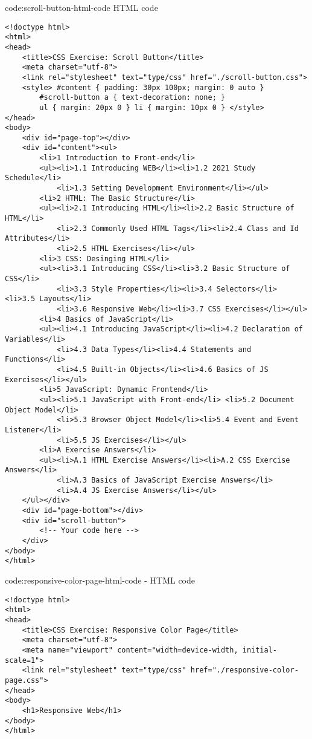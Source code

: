 \begin{code}{code:scroll-button-html-code}{ HTML code}
\begin{verbatim}
<!doctype html>
<html>
<head>
    <title>CSS Exercise: Scroll Button</title>
    <meta charset="utf-8">
    <link rel="stylesheet" text="type/css" href="./scroll-button.css">
    <style> #content { padding: 30px 100px; margin: 0 auto }
        #scroll-button a { text-decoration: none; }
        ul { margin: 20px 0 } li { margin: 10px 0 } </style>
</head>
<body>
    <div id="page-top"></div>
    <div id="content"><ul>
        <li>1 Introduction to Front-end</li>
        <ul><li>1.1 Introducing WEB</li><li>1.2 2021 Study Schedule</li>
            <li>1.3 Setting Development Environment</li></ul>
        <li>2 HTML: The Basic Structure</li>
        <ul><li>2.1 Introducing HTML</li><li>2.2 Basic Structure of HTML</li>
            <li>2.3 Commonly Used HTML Tags</li><li>2.4 Class and Id Attributes</li>
            <li>2.5 HTML Exercises</li></ul>
        <li>3 CSS: Desinging HTML</li>
        <ul><li>3.1 Introducing CSS</li><li>3.2 Basic Structure of CSS</li>
            <li>3.3 Style Properties</li><li>3.4 Selectors</li> <li>3.5 Layouts</li>
            <li>3.6 Responsive Web</li><li>3.7 CSS Exercises</li></ul>
        <li>4 Basics of JavaScript</li>
        <ul><li>4.1 Introducing JavaScript</li><li>4.2 Declaration of Variables</li>
            <li>4.3 Data Types</li><li>4.4 Statements and Functions</li>
            <li>4.5 Built-in Objects</li><li>4.6 Basics of JS Exercises</li></ul>
        <li>5 JavaScript: Dynamic Frontend</li>
        <ul><li>5.1 JavaScript with Front-end</li> <li>5.2 Document Object Model</li>
            <li>5.3 Browser Object Model</li><li>5.4 Event and Event Listener</li>
            <li>5.5 JS Exercises</li></ul>
        <li>A Exercise Answers</li>
        <ul><li>A.1 HTML Exercise Answers</li><li>A.2 CSS Exercise Answers</li>
            <li>A.3 Basics of JavaScript Exercise Answers</li>
            <li>A.4 JS Exercise Answers</li></ul>
    </ul></div>
    <div id="page-bottom"></div>
    <div id="scroll-button">
        <!-- Your code here -->
    </div>
</body>
</html>
\end{verbatim}
\end{code}

\begin{code}{code:responsive-color-page-html-code}{ - HTML code}
\begin{verbatim}
<!doctype html>
<html>
<head>
    <title>CSS Exercise: Responsive Color Page</title>
    <meta charset="utf-8">
    <meta name="viewport" content="width=device-width, initial-scale=1">
    <link rel="stylesheet" text="type/css" href="./responsive-color-page.css">
</head>
<body>
    <h1>Responsive Web</h1>
</body>
</html>
\end{verbatim}
\end{code}


